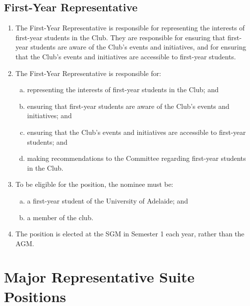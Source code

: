 \documentclass{schedule}
\begin{document}
\subsection{First-Year Representative}
\begin{enumerate}[(1)]
    \item The First-Year Representative is responsible for representing the interests of first-year students in the Club. They are responsible for ensuring that first-year students are aware of the Club's events and initiatives, and for ensuring that the Club's events and initiatives are accessible to first-year students.
    \item The First-Year Representative is responsible for:
          \begin{enumerate}[(a)]
              \item representing the interests of first-year students in the Club; and
              \item ensuring that first-year students are aware of the Club's events and initiatives; and
              \item ensuring that the Club's events and initiatives are accessible to first-year students; and
              \item making recommendations to the Committee regarding first-year students in the Club.
          \end{enumerate}
    \item To be eligible for the position, the nominee must be:
          \begin{enumerate}[(a)]
              \item a first-year student of the University of Adelaide; and
              \item a member of the club.
          \end{enumerate}
    \item The position is elected at the SGM in Semester 1 each year, rather than the AGM.
\end{enumerate}


\section{Major Representative Suite Positions}
\end{document}
